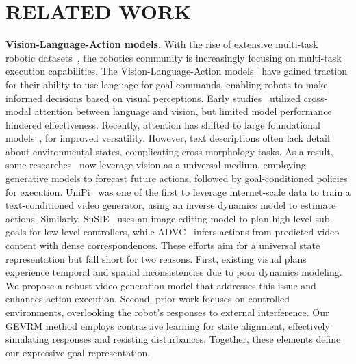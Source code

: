 \section{RELATED WORK}


\noindent\textbf{Vision-Language-Action models.} 
With the rise of extensive multi-task robotic datasets~\citep{vuong2023open}, the robotics community is increasingly focusing on multi-task execution capabilities. The Vision-Language-Action models~\citep{brohan2022rt,yue2024deer} have gained traction for their ability to use language for goal commands, enabling robots to make informed decisions based on visual perceptions. Early studies~\citep{brohan2022rt, Wu2023UnleashingLV} utilized cross-modal attention between language and vision, but limited model performance hindered effectiveness. Recently, attention has shifted to large foundational models~\citep{alayrac2022flamingo,li2023vision,kim2024openvla}, for improved versatility. However, text descriptions often lack detail about environmental states, complicating cross-morphology tasks. As a result, some researches~\citep{du2024learning,ko2023learning,zhou2024robodreamer,black2023zero,ajay2024compositional,yang2023learning} now leverage vision as a universal medium, employing generative models to forecast future actions, followed by goal-conditioned policies for execution.
UniPi~\citep{du2024learning} was one of the first to leverage internet-scale data to train a text-conditioned video generator, using an inverse dynamics model to estimate actions. Similarly,  SuSIE~\citep{black2023zero} uses an image-editing model to plan high-level sub-goals for low-level controllers, while ADVC~\citep{ko2023learning} infers actions from predicted video content with dense correspondences.
These efforts aim for a universal state representation but fall short for two reasons. First, existing visual plans experience temporal and spatial inconsistencies due to poor dynamics modeling. We propose a robust video generation model that addresses this issue and enhances action execution. Second, prior work focuses on controlled environments, overlooking the robot's responses to external interference. Our GEVRM method employs contrastive learning for state alignment, effectively simulating responses and resisting disturbances. Together, these elements define our expressive goal representation.


